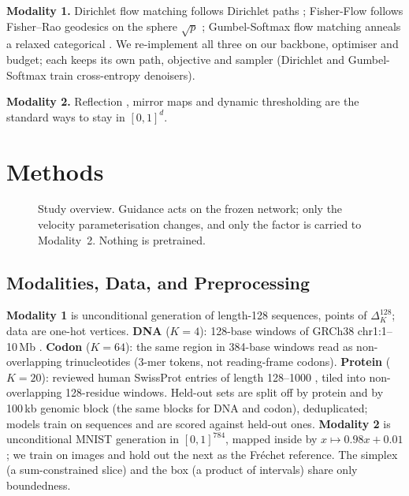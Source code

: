 \documentclass{article}
\begin{document}
\textbf{Modality 1.} Dirichlet flow matching follows Dirichlet paths \citep{stark2024dirichlet};
Fisher-Flow follows Fisher--Rao geodesics on the sphere $\sqrt p$ \citep{davis2024fisher};
Gumbel-Softmax flow matching anneals a relaxed categorical \citep{tang2025gumbel}. We re-implement
all three on our backbone, optimiser and budget; each keeps its own path, objective and sampler
(Dirichlet and Gumbel-Softmax train cross-entropy denoisers).

\textbf{Modality 2.} Reflection \citep{lou2023reflected}, mirror maps \citep{liu2023mirror} and
dynamic thresholding \citep{saharia2022imagen} are the standard ways to stay in $[0,1]^d$.

\section{Methods}

\begin{figure}[t]
\centering

\caption{Study overview. Guidance acts on the frozen network; only the velocity parameterisation
changes, and only the factor is carried to Modality~2. Nothing is pretrained.}
\label{fig:overview}
\end{figure}

\subsection{Modalities, Data, and Preprocessing}
\textbf{Modality 1} is unconditional generation of length-128 sequences, points of
$\Delta_K^{128}$; data are one-hot vertices. \textbf{DNA} ($K=4$): 128-base windows of GRCh38
chr1:1--10\,Mb \citep{ensembl2023}. \textbf{Codon} ($K=64$): the same region in 384-base windows
read as non-overlapping trinucleotides (3-mer tokens, not reading-frame codons). \textbf{Protein}
($K=20$): reviewed human SwissProt entries of length 128--1000 \citep{uniprot2023}, tiled into
non-overlapping 128-residue windows. Held-out sets are split off by protein and by 100\,kb genomic
block (the same blocks for DNA and codon), deduplicated; models train on \MOneTrain{} sequences
and are scored against \MOneHeldout{} held-out ones.
\textbf{Modality 2} is unconditional MNIST \citep{lecun1998mnist} generation in $[0,1]^{784}$,
mapped inside by $x\mapsto0.98x+0.01$; we train on \MTwoTrain{} images and hold out the next
\MTwoEval{} as the Fr\'echet reference. The simplex (a sum-constrained slice) and the box (a
product of intervals) share only boundedness.
\end{document}

